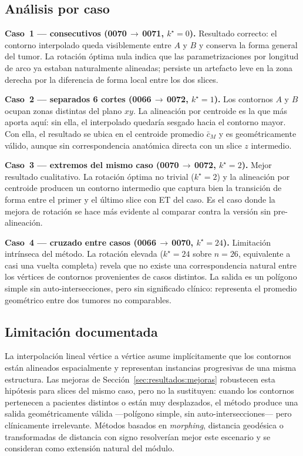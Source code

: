 \documentclass[conference]{IEEEtran}
\begin{document}
\subsection{Análisis por caso}
\label{sec:resultados:porcaso}

\textbf{Caso~1 — consecutivos (0070\,$\rightarrow$\,0071,
$k^{\star}=0$).} Resultado correcto: el contorno interpolado
queda visiblemente entre $A$ y $B$ y conserva la forma
general del tumor. La rotación óptima nula indica que las
parametrizaciones por longitud de arco ya estaban
naturalmente alineadas; persiste un artefacto leve en la
zona derecha por la diferencia de forma local entre los dos
slices.

\textbf{Caso~2 — separados 6 cortes
(0066\,$\rightarrow$\,0072, $k^{\star}=1$).} Los contornos
$A$ y $B$ ocupan zonas distintas del plano $xy$. La
alineación por centroide es la que más aporta aquí: sin
ella, el interpolado quedaría sesgado hacia el contorno
mayor. Con ella, el resultado se ubica en el centroide
promedio $\bar{c}_M$ y es geométricamente válido, aunque
sin correspondencia anatómica directa con un slice $z$
intermedio.

\textbf{Caso~3 — extremos del mismo caso
(0070\,$\rightarrow$\,0072, $k^{\star}=2$).} Mejor
resultado cualitativo. La rotación óptima no trivial
($k^{\star}=2$) y la alineación por centroide producen un
contorno intermedio que captura bien la transición de forma
entre el primer y el último slice con ET del caso. Es el
caso donde la mejora de rotación se hace más evidente al
comparar contra la versión sin pre-alineación.

\textbf{Caso~4 — cruzado entre casos
(0066\,$\rightarrow$\,0070, $k^{\star}=24$).} Limitación
intrínseca del método. La rotación elevada ($k^{\star}=24$
sobre $n=26$, equivalente a casi una vuelta completa)
revela que no existe una correspondencia natural entre los
vértices de contornos provenientes de casos distintos. La
salida es un polígono simple sin auto-intersecciones, pero
sin significado clínico: representa el promedio geométrico
entre dos tumores no comparables.

\subsection{Limitación documentada}
\label{sec:resultados:limitacion}
La interpolación lineal vértice a vértice asume
implícitamente que los contornos están alineados
espacialmente y representan instancias progresivas de una
misma estructura. Las mejoras de Sección~\ref{sec:resultados:mejoras}
robustecen esta hipótesis para slices del mismo caso, pero
no la sustituyen: cuando los contornos pertenecen a
pacientes distintos o están muy desplazados, el método
produce una salida geométricamente válida ---polígono
simple, sin auto-intersecciones--- pero clínicamente
irrelevante. Métodos basados en \emph{morphing}, distancia
geodésica o transformadas de distancia con signo resolverían
mejor este escenario y se consideran como extensión natural
del módulo.
\end{document}
